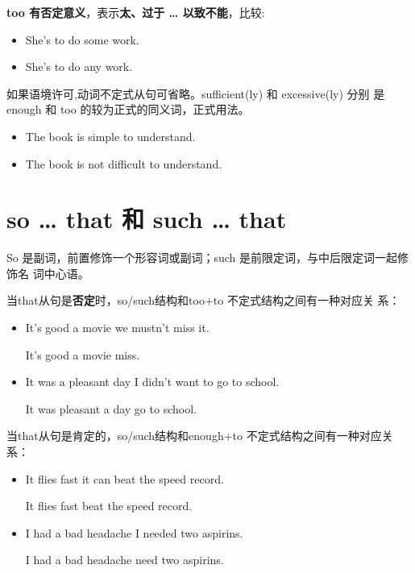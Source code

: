 \textbf{too 有否定意义}，表示\textbf{太、过于 \ldots{} 以致不能}，比较:
\begin{itemize}
\item She's  to do some work.
\item She's  to do any work.
\end{itemize}

如果语境许可,动词不定式从句可省略。sufficient(ly) 和 excessive(ly) 分别
是 enough 和 too 的较为正式的同义词，正式用法。
\begin{itemize}
\item The book is  simple to understand.
\item The book is not  difficult to understand.
\end{itemize}

\section{so \ldots{} that 和 such \ldots{} that}

So 是副词，前置修饰一个形容词或副词；such 是前限定词，与中后限定词一起修饰名
词中心语。

当that从句是\textbf{否定}时，so/such结构和too+to 不定式结构之间有一种对应关
系：
\begin{itemize}
\item It's  good a movie  we mustn't miss it.

  It's  good a movie  miss.

\item It was  a pleasant day  I didn't want to go to school.

  It was  pleasant a day  go to school.
\end{itemize}

当that从句是肯定的，so/such结构和enough+to 不定式结构之间有一种对应关系：
\begin{itemize}
\item It flies  fast  it can beat the speed record.

  It flies fast  beat the speed record.

\item I had  a bad headache  I needed two aspirins.

  I had a bad  headache  need two aspirins.
\end{itemize}



